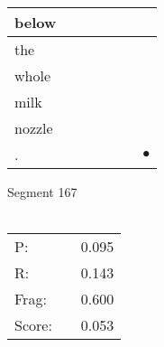 \documentclass[landscape]{article}
\newcommand{\ssp}{\hspace{2pt}}
\newcommand{\mex}{\cellcolor{g}$\bullet$}
\begin{document}
\begin{tabular}{|l|p{10pt}|p{10pt}|p{10pt}|p{10pt}|p{10pt}|p{10pt}|}
\hline
\ssp below \ssp&\hspace{2pt}&\hspace{2pt}&\hspace{2pt}&\hspace{2pt}&\hspace{2pt}&\hspace{2pt}\\
\hline
\ssp the \ssp&\hspace{2pt}&\hspace{2pt}&\hspace{2pt}&\hspace{2pt}&\hspace{2pt}&\hspace{2pt}\\
\hline
\ssp whole \ssp&\hspace{2pt}&\hspace{2pt}&\hspace{2pt}&\hspace{2pt}&\hspace{2pt}&\hspace{2pt}\\
\hline
\ssp milk \ssp&\hspace{2pt}&\hspace{2pt}&\hspace{2pt}&\hspace{2pt}&\hspace{2pt}&\hspace{2pt}\\
\hline
\ssp nozzle \ssp&\hspace{2pt}&\hspace{2pt}&\hspace{2pt}&\hspace{2pt}&\hspace{2pt}&\hspace{2pt}\\
\hline
\ssp \cellcolor{ref5}. \ssp&\hspace{2pt}&\hspace{2pt}&\hspace{2pt}&\hspace{2pt}&\hspace{2pt}&\hspace{2pt}\mex\\
\hline
\end{tabular}

\vspace{6pt}
\noindent Segment 167\\\\
\noindent\begin{tabular}{lm{12pt}r}
\hline
P:&&0.095\\
R:&&0.143\\
Frag:&&0.600\\
Score:&&0.053\\
\end{tabular}
\end{document}
